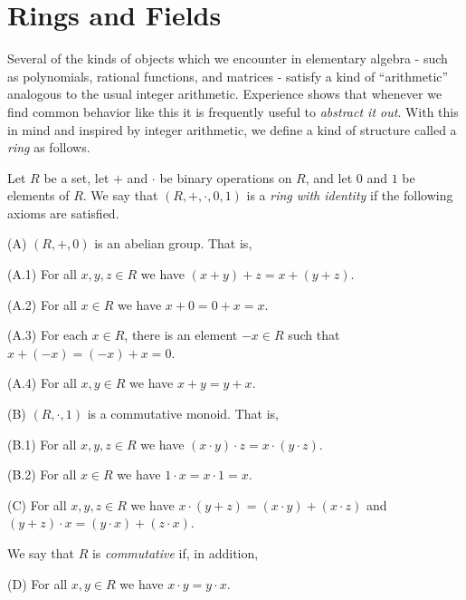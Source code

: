 \section{Rings and Fields}

Several of the kinds of objects which we encounter in elementary algebra - such as polynomials, rational functions, and matrices - satisfy a kind of ``arithmetic'' analogous to the usual integer arithmetic. Experience shows that whenever we find common behavior like this it is frequently useful to \emph{abstract it out}. With this in mind and inspired by integer arithmetic, we define a kind of structure called a \emph{ring} as follows.

\begin{dfn}
\label{dfn:ring}
Let $R$ be a set, let $+$ and $\cdot$ be binary operations on $R$, and let $0$ and $1$ be elements of $R$. We say that $(R,+,\cdot,0,1)$ is a \emph{ring with identity} if the following axioms are satisfied.
\begin{enumerate*}
\item[(A)] $(R,+,0)$ is an abelian group. That is,
\begin{enumerate*}
\item[(A.1)] For all $x,y,z \in R$ we have $(x+y)+z = x+(y+z)$.
\item[(A.2)] For all $x \in R$ we have $x+0 = 0+x = x$.
\item[(A.3)] For each $x \in R$, there is an element $-x \in R$ such that $x + (-x) = (-x) + x = 0$.
\item[(A.4)] For all $x,y \in R$ we have $x+y = y+x$.
\end{enumerate*}
\item[(B)] $(R,\cdot,1)$ is a commutative monoid. That is,
\begin{enumerate*}
\item[(B.1)] For all $x,y,z \in R$ we have $(x \cdot y) \cdot z = x \cdot (y \cdot z)$.
\item[(B.2)] For all $x \in R$ we have $1 \cdot x = x \cdot 1 = x$.
\end{enumerate*}
\item[(C)] For all $x,y,z \in R$ we have $x \cdot (y+z) = (x \cdot y) + (x \cdot z)$ and $(y+z)\cdot x = (y \cdot x) + (z \cdot x)$.
\end{enumerate*}
We say that $R$ is \emph{commutative} if, in addition,
\begin{enumerate*}
\item[(D)] For all $x,y \in R$ we have $x \cdot y = y \cdot x$.
\end{enumerate*}
\end{dfn}

